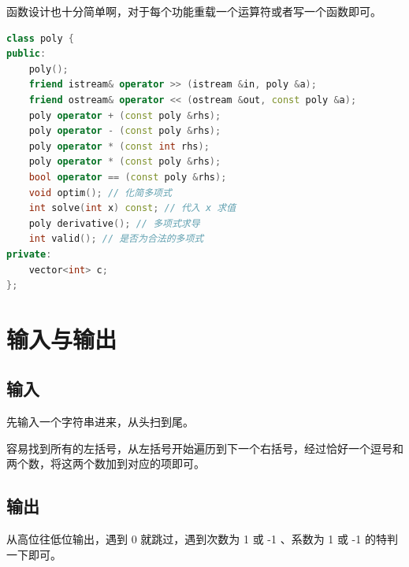 \documentclass{article}
\begin{document}
函数设计也十分简单啊，对于每个功能重载一个运算符或者写一个函数即可。

\begin{lstlisting}[language=C++]
class poly {
public:
    poly();
    friend istream& operator >> (istream &in, poly &a);
    friend ostream& operator << (ostream &out, const poly &a);
    poly operator + (const poly &rhs);
    poly operator - (const poly &rhs);
    poly operator * (const int rhs);
    poly operator * (const poly &rhs);
    bool operator == (const poly &rhs);
    void optim(); // 化简多项式
    int solve(int x) const; // 代入 x 求值
    poly derivative(); // 多项式求导
    int valid(); // 是否为合法的多项式
private:
    vector<int> c;
};
\end{lstlisting}

\section{输入与输出}

\subsection{输入}

先输入一个字符串进来，从头扫到尾。

容易找到所有的左括号，从左括号开始遍历到下一个右括号，经过恰好一个逗号和两个数，将这两个数加到对应的项即可。

\subsection{输出}

从高位往低位输出，遇到 0 就跳过，遇到次数为 1 或 -1 、系数为 1 或 -1 的特判一下即可。
\end{document}
